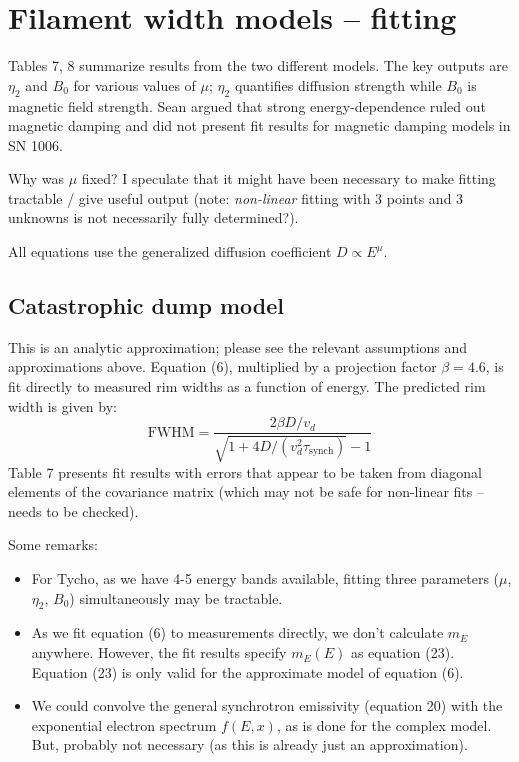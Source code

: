 \documentclass[10pt]{article}
\newcommand{\mt}{\mathrm}
\begin{document}
\section{Filament width models -- fitting}

Tables 7, 8 summarize results from the two different models.  The key outputs
are $\eta_2$ and $B_0$ for various values of $\mu$; $\eta_2$ quantifies
diffusion strength while $B_0$ is magnetic field strength.
Sean argued that strong energy-dependence ruled out magnetic damping and did
not present fit results for magnetic damping models in SN 1006.

Why was $\mu$ fixed?  I speculate that it might have been necessary to make
fitting tractable / give useful output (note: \emph{non-linear} fitting with
3 points and 3 unknowns is not necessarily fully determined?).

All equations use the generalized diffusion coefficient $D \propto E^\mu$.

\subsection{Catastrophic dump model}

This is an analytic approximation; please see the relevant assumptions and
approximations above.  Equation (6), multiplied by a projection factor
$\beta=4.6$, is fit directly to measured rim widths as a function of energy.  
The predicted rim width is given by:
\[
  \mt{FWHM} = \frac{2\beta D / v_d}
              {\sqrt{1 + 4D/\left(v_d^2 \tau_{\mt{synch}}\right) } - 1}
\]
Table 7 presents fit results with errors that appear to be taken
from diagonal elements of the covariance matrix (which may not be safe for
non-linear fits -- needs to be checked).

Some remarks:
\begin{itemize}
  \item For Tycho, as we have 4-5 energy bands available, fitting three
  parameters ($\mu$, $\eta_2$, $B_0$) simultaneously may be tractable.
  \item As we fit equation (6) to measurements directly, we don't calculate
  $m_E$ anywhere.  However, the fit results specify $m_E(E)$ as equation (23).
  Equation (23) is only valid for the approximate model of equation (6).
  \item We could convolve the general synchrotron emissivity (equation 20) with
  the exponential electron spectrum $f(E,x)$, as is done for the complex model.
  But, probably not necessary (as this is already just an approximation).
\end{itemize}
\end{document}
